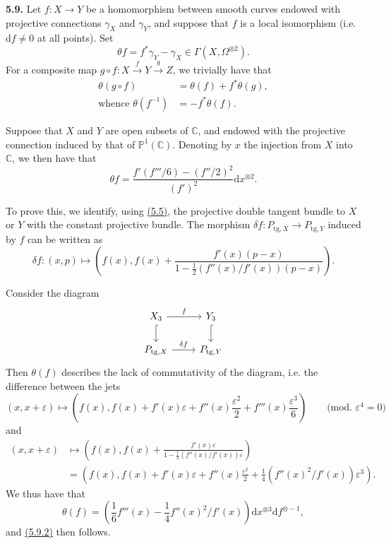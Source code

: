 \documentclass{report}
\newenvironment{rmenv}[1]
  {\phantomsection\par\medskip\noindent\textbf{#1.}\rmfamily}
  {\par\medskip}
\newcommand{\PP}{\mathbb{P}}
\newcommand{\CC}{\mathbb{C}}
\newcommand{\dd}{\mathrm{d}}
\newcommand{\tg}{\mathrm{tg}}
\newcommand{\oldpage}[1]{\marginpar{\footnotesize$\Big\vert$ \textit{p.~#1}}}
\begin{document}
\begin{rmenv}{5.9}
\label{I.5.9}
  Let $f\colon X\to Y$ be a homomorphism between smooth curves endowed with projective connections $\gamma_X$ and $\gamma_Y$, and suppose that $f$ is a local isomorphism (i.e. $\dd f\neq0$ at all points).
  Set
  \[
    \theta f = f^*\gamma_Y - \gamma_X \in \Gamma(X,\Omega^{\otimes2}).
  \]
  For a composite map $g\circ f\colon X\xrightarrow{f}Y\xrightarrow{g}Z$, we trivially have that
  \[
  \label{I.5.9.1}
    \begin{aligned}
      \theta(g\circ f) &= \theta(f) + f^*\theta(g),
    \\\mbox{whence }\theta(f^{-1}) &= -f^*\theta(f).
    \end{aligned}
  \tag{5.9.1}
  \]

  Suppose that $X$ and $Y$ are open subsets of $\CC$, and endowed with the projective connection induced by that of $\PP^1(\CC)$.
  Denoting by $x$ the injection from $X$ into $\CC$, we then have that
\oldpage{33}
  \[
  \label{I.5.9.2}
    \theta f = \frac{f'(f'''/6) - (f''/2)^2}{(f')^2} \dd x^{\otimes2}.
  \tag{5.9.2}
  \]

  To prove this, we identify, using \hyperref[I.5.5]{(5.5)}, the projective double tangent bundle to $X$ or $Y$ with the constant projective bundle.
  The morphism $\delta f\colon P_{\tg,X}\to P_{\tg,Y}$ induced by $f$ can be written as
  \[
    \delta f\colon (x,p) \mapsto
    \left(
      f(x),
      f(x) + \frac{f'(x)(p-x)}{1-\frac12(f''(x)/f'(x))(p-x)}
    \right).
  \]

  Consider the diagram
  \[
    \begin{tikzcd}
      X_3 \rar["f"] \dar[hook]
      & Y_3 \dar[hook]
    \\P_{\tg,X} \rar["\delta f"]
      & P_{\tg,Y}
    \end{tikzcd}
  \]
  Then $\theta(f)$ describes the lack of commutativity of the diagram, i.e. the difference between the jets
  \[
    (x,x+\varepsilon)
    \mapsto
    \left(
      f(x),
      f(x) + f'(x)\varepsilon + f''(x)\frac{\varepsilon^2}{2} + f'''(x)\frac{\varepsilon^3}{6}
    \right)
    \qquad\mbox{(mod. $\varepsilon^4=0$)}
  \]
  and
  \[
    \begin{aligned}
      (x,x+\varepsilon)
      &\mapsto
      \left(
        f(x),
        f(x) + \frac{f'(x)\varepsilon}{1-\frac12(f''(x)/f'(x))\varepsilon}
      \right)
    \\&= \left(
        f(x),
        f(x) + f'(x)\varepsilon + f''(x)\frac{\varepsilon^2}{2} + \frac14(f''(x)^2/f'(x))\varepsilon^3
      \right).
    \end{aligned}
  \]
  We thus have that
  \[
    \theta(f) =
    \left(
      \frac16f'''(x) - \frac14f''(x)^2/f'(x)
    \right) \dd x^{\otimes3} \dd f^{\otimes-1},
  \]
  and \hyperref[I.5.9.2]{(5.9.2)} then follows.


\end{rmenv}
\end{document}

